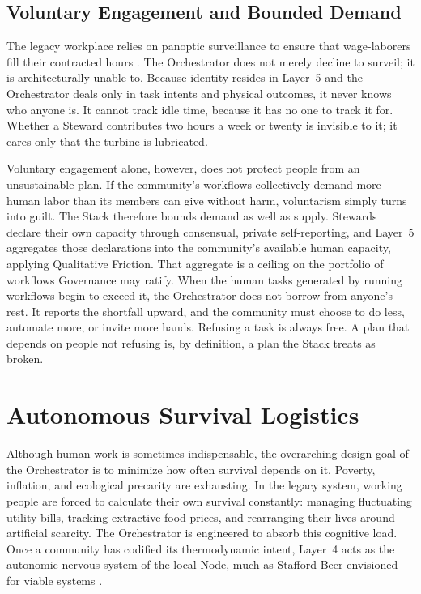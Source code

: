 \subsection{Voluntary Engagement and Bounded Demand}

The legacy workplace relies on panoptic surveillance to ensure that wage-laborers fill their contracted hours \parencite{zuboff2019}. The Orchestrator does not merely decline to surveil; it is architecturally unable to. Because identity resides in Layer~5 and the Orchestrator deals only in task intents and physical outcomes, it never knows who anyone is. It cannot track idle time, because it has no one to track it for. Whether a Steward contributes two hours a week or twenty is invisible to it; it cares only that the turbine is lubricated.

Voluntary engagement alone, however, does not protect people from an unsustainable plan. If the community's workflows collectively demand more human labor than its members can give without harm, voluntarism simply turns into guilt. The Stack therefore bounds demand as well as supply. Stewards declare their own capacity through consensual, private self-reporting, and Layer~5 aggregates those declarations into the community's available human capacity, applying Qualitative Friction. That aggregate is a ceiling on the portfolio of workflows Governance may ratify. When the human tasks generated by running workflows begin to exceed it, the Orchestrator does not borrow from anyone's rest. It reports the shortfall upward, and the community must choose to do less, automate more, or invite more hands. Refusing a task is always free. A plan that depends on people not refusing is, by definition, a plan the Stack treats as broken.

\section{Autonomous Survival Logistics}

Although human work is sometimes indispensable, the overarching design goal of the Orchestrator is to minimize how often survival depends on it. Poverty, inflation, and ecological precarity are exhausting. In the legacy system, working people are forced to calculate their own survival constantly: managing fluctuating utility bills, tracking extractive food prices, and rearranging their lives around artificial scarcity. The Orchestrator is engineered to absorb this cognitive load. Once a community has codified its thermodynamic intent, Layer~4 acts as the autonomic nervous system of the local Node, much as Stafford Beer envisioned for viable systems \parencite{beer1972,beer1979}.

